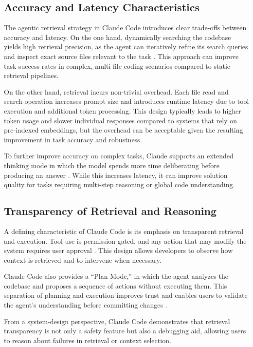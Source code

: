 \subsection{Accuracy and Latency Characteristics}
The agentic retrieval strategy in Claude Code introduces clear trade-offs between accuracy and latency. On the one hand, dynamically searching the codebase yields high retrieval precision, as the agent can iteratively refine its search queries and inspect exact source files relevant to the task \cite{anthropic_claude_code_settings}. This approach can improve task success rates in complex, multi-file coding scenarios compared to static retrieval pipelines.

On the other hand, retrieval incurs non-trivial overhead. Each file read and search operation increases prompt size and introduces runtime latency due to tool execution and additional token processing. This design typically leads to higher token usage and slower individual responses compared to systems that rely on pre-indexed embeddings, but the overhead can be acceptable given the resulting improvement in task accuracy and robustness.

To further improve accuracy on complex tasks, Claude supports an extended thinking mode in which the model spends more time deliberating before producing an answer \cite{anthropic_extended_thinking}. While this increases latency, it can improve solution quality for tasks requiring multi-step reasoning or global code understanding.

\subsection{Transparency of Retrieval and Reasoning}
A defining characteristic of Claude Code is its emphasis on transparent retrieval and execution. Tool use is permission-gated, and any action that may modify the system requires user approval \cite{anthropic_claude_code_settings,anthropic_claude_code_team}. This design allows developers to observe how context is retrieved and to intervene when necessary.

Claude Code also provides a “Plan Mode,” in which the agent analyzes the codebase and proposes a sequence of actions without executing them. This separation of planning and execution improves trust and enables users to validate the agent’s understanding before committing changes \cite{anthropic_claude_code_tutorials}.

From a system-design perspective, Claude Code demonstrates that retrieval transparency is not only a safety feature but also a debugging aid, allowing users to reason about failures in retrieval or context selection.

